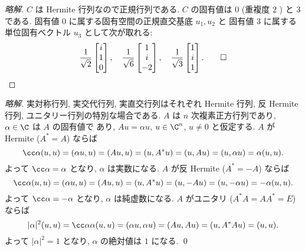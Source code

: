 \documentclass[12pt,twoside]{jarticle}
\begin{document}
\begin{proof}[\protect{[150]}略解]
  $C$ は Hermite 行列なので正規行列である.
  $C$ の固有値は $0$ (重複度 $2$ ) と $3$ である.
  固有値 $0$ に属する固有空間の正規直交基底 $u_1,u_2$ と
  固有値 $3$ に属する単位固有ベクトル $u_3$ として次が取れる:
  \begin{equation*}
    \frac{1}{\sqrt{2}}
    \begin{bmatrix}
      i \\ 1 \\ 0 \\
    \end{bmatrix},
    \quad
    \frac{1}{\sqrt{6}}
    \begin{bmatrix}
      1 \\ i \\ -2 \\
    \end{bmatrix},
    \quad
    \frac{1}{\sqrt{3}}
    \begin{bmatrix}
      1 \\ i \\ 1 \\
    \end{bmatrix}.
    \qed
  \end{equation*}
\end{proof}


\begin{proof}[\protect{[151]}略解]
  実対称行列, 実交代行列, 実直交行列はそれぞれ
  Hermite 行列, 反 Hermite 行列, ユニタリー行列の特別な場合である.
  $A$ は $n$ 次複素正方行列であり, $\alpha\in\C$ は $A$ の固有値で
  あり, $Au=\alpha u$, $u\in\C^n$, $u\ne 0$ と仮定する.
  $A$ が Hermite ($A^*=A$) ならば
  \begin{equation*}
    \cc\alpha(u,u) = (\alpha u,u) = (Au,u) = (u,A^*u)
    = (u,Au) = (u,\alpha u) = \alpha(u,u).
  \end{equation*}
  よって $\cc\alpha = \alpha$ となり, $\alpha$ は実数になる.
  $A$ が反 Hermite ($A^*=-A$) ならば
  \begin{equation*}
    \cc\alpha(u,u)  = (\alpha u,u)= (Au,u) = (u,A^*u) 
    = (u,-Au) = (u,-\alpha u) = -\alpha(u,u).
  \end{equation*}
  よって $\cc\alpha = -\alpha$ となり, $\alpha$ は純虚数になる.
  $A$ がユニタリ ($A^*A=AA^*=E$) ならば
  \begin{equation*}
    |\alpha|^2(u,u) = \cc\alpha\alpha(u,u) = (\alpha u,\alpha u)
    = (Au,Au) = (u,A^*Au) = (u,u).
  \end{equation*}
  よって $|\alpha|^2=1$ となり, $\alpha$ の絶対値は $1$ になる.
  \qed
\end{proof}
\end{document}
